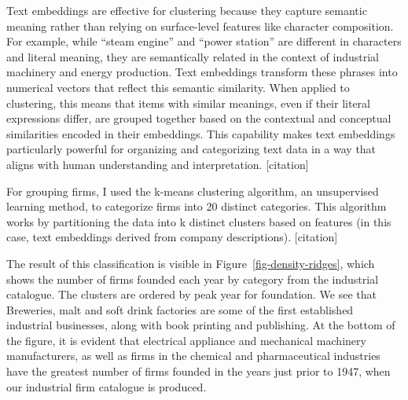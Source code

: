 \documentclass[
]{article}
\begin{document}
Text embeddings are effective for clustering because they capture
semantic meaning rather than relying on surface-level features like
character composition. For example, while ``steam engine'' and ``power
station'' are different in characters and literal meaning, they are
semantically related in the context of industrial machinery and energy
production. Text embeddings transform these phrases into numerical
vectors that reflect this semantic similarity. When applied to
clustering, this means that items with similar meanings, even if their
literal expressions differ, are grouped together based on the contextual
and conceptual similarities encoded in their embeddings. This capability
makes text embeddings particularly powerful for organizing and
categorizing text data in a way that aligns with human understanding and
interpretation. {[}citation{]}

For grouping firms, I used the k-means clustering algorithm, an
unsupervised learning method, to categorize firms into 20 distinct
categories. This algorithm works by partitioning the data into k
distinct clusters based on features (in this case, text embeddings
derived from company descriptions). {[}citation{]}

The result of this classification is visible in
Figure~\ref{fig-density-ridges}, which shows the number of firms founded
each year by category from the industrial catalogue. The clusters are
ordered by peak year for foundation. We see that Breweries, malt and
soft drink factories are some of the first established industrial
businesses, along with book printing and publishing. At the bottom of
the figure, it is evident that electrical appliance and mechanical
machinery manufacturers, as well as firms in the chemical and
pharmaceutical industries have the greatest number of firms founded in
the years just prior to 1947, when our industrial firm catalogue is
produced.
\end{document}
